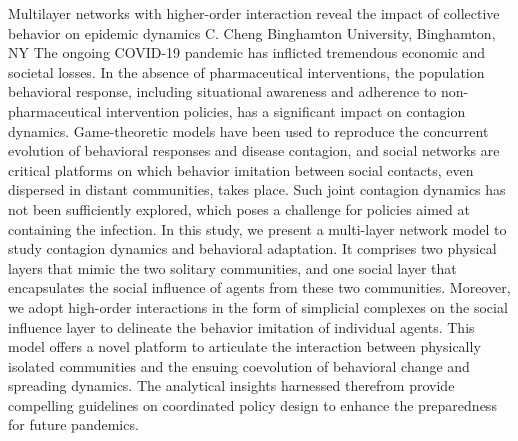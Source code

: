 
    \begin{abstract_online}{Multilayer networks with higher-order interaction reveal the impact of collective behavior on epidemic dynamics}{%
        C. Cheng}{%
        }{%
        Binghamton University, Binghamton, NY}
    The ongoing COVID-19 pandemic has inflicted tremendous economic and societal losses. In the absence of pharmaceutical interventions, the population behavioral response, including situational awareness and adherence to non-pharmaceutical intervention policies, has a significant impact on contagion dynamics. Game-theoretic models have been used to reproduce the concurrent evolution of behavioral responses and disease contagion, and social networks are critical platforms on which behavior imitation between social contacts, even dispersed in distant communities, takes place. Such joint contagion dynamics has not been sufficiently explored, which poses a challenge for policies aimed at containing the infection. In this study, we present a multi-layer network model to study contagion dynamics and behavioral adaptation. It comprises two physical layers that mimic the two solitary communities, and one social layer that encapsulates the social influence of agents from these two communities. Moreover, we adopt high-order interactions in the form of simplicial complexes on the social influence layer to delineate the behavior imitation of individual agents. This model offers a novel platform to articulate the interaction between physically isolated communities and the ensuing coevolution of behavioral change and spreading dynamics. The analytical insights harnessed therefrom provide compelling guidelines on coordinated policy design to enhance the preparedness for future pandemics. 
    
    \end{abstract_online}
    